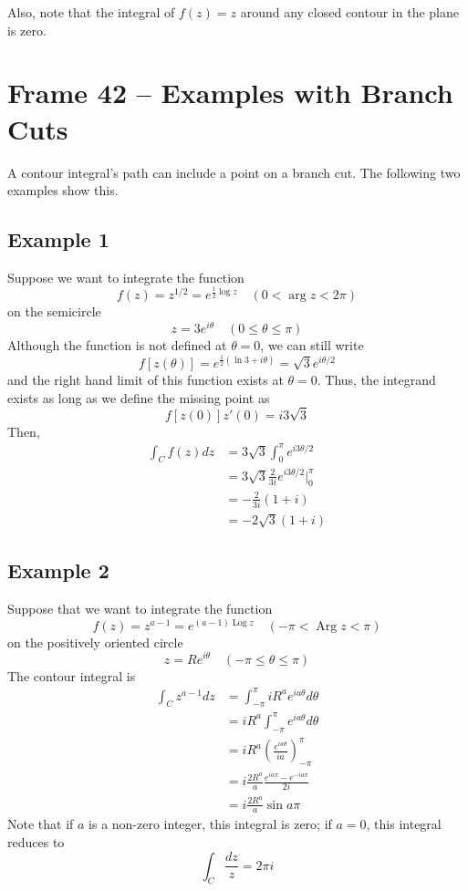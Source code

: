 \documentclass{article}
\DeclareMathOperator{\Log}{Log}
\DeclareMathOperator{\Arg}{Arg}
\begin{document}
Also, note that the integral of $f(z) = z$ around any closed contour in the plane is zero.


\clearpage
\section{Frame 42 -- Examples with Branch Cuts}
A contour integral's path can include a point on a branch cut. The following two examples show this.

\subsection{Example 1}
Suppose we want to integrate the function 
\[
	f(z) = z^{1/2} = e^{\frac{1}{2} \log z}	\quad (0 < \arg z < 2\pi)
\]
on the semicircle
\[
	z = 3e^{i\theta}	\quad(0 \le \theta \le \pi)
\]
Although the function is not defined at $\theta = 0$, we can still write
\[
	f[z(\theta)] = e^{\frac{1}{2}(\ln 3 + i\theta)} = \sqrt{3} e^{i\theta/2}
\]
and the right hand limit of this function exists at $\theta = 0$. Thus, the integrand exists as long as we define the missing point as
\[
	f[z(0)] z'(0) = i3\sqrt{3}
\]
Then,
\begin{align*}
	\int_C f(z) dz 
	&= 3\sqrt{3} \int_0^\pi e^{i3\theta / 2} \\
	&= 3\sqrt{3} \frac{2}{3i} e^{i3\theta / 2} \Big|_0^\pi \\
	&= -\frac{2}{3i} (1 + i) \\
	&= -2\sqrt{3}(1 + i)
\end{align*}


\subsection{Example 2}
Suppose that we want to integrate the function
\[
	f(z) = z^{a - 1} = e^{(a - 1) \Log z} \quad (-\pi < \Arg z < \pi)
\]
on the positively oriented circle
\[
	z = Re^{i\theta}	\quad (-\pi \le \theta \le \pi)
\]
The contour integral is
\begin{align*}
	\int_C z^{a - 1} dz
	&= \int_{-\pi}^{\pi} iR^ae^{ia\theta} d\theta \\
	&= iR^a \int_{-\pi}^{\pi} e^{ia\theta} d\theta \\
	&= iR^a \left( \frac{e^{ia\theta}}{ia} \right)_{-\pi}^{\pi} \\
	&= i\frac{2R^a}{a} \frac{e^{ia\pi} - e^{-ia\pi}}{2i} \\
	&= i\frac{2R^a}{a} \sin a\pi
\end{align*}
Note that if $a$ is a non-zero integer, this integral is zero; if $a = 0$, this integral reduces to
\[
	\int_C \frac{dz}{z} = 2\pi i
\]
\end{document}
